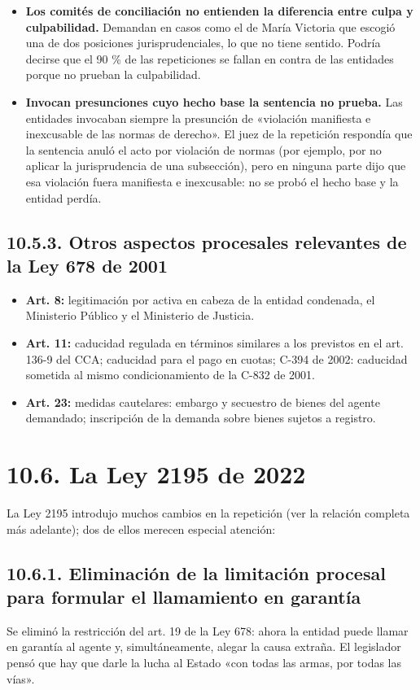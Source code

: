\begin{itemize}
\item \textbf{Los comités de conciliación no entienden la diferencia entre culpa y culpabilidad.} Demandan en casos como el de María Victoria que escogió una de dos posiciones jurisprudenciales, lo que no tiene sentido. Podría decirse que el 90 \% de las repeticiones se fallan en contra de las entidades porque no prueban la culpabilidad.
\item \textbf{Invocan presunciones cuyo hecho base la sentencia no prueba.} Las entidades invocaban siempre la presunción de «violación manifiesta e inexcusable de las normas de derecho». El juez de la repetición respondía que la sentencia anuló el acto por violación de normas (por ejemplo, por no aplicar la jurisprudencia de una subsección), pero en ninguna parte dijo que esa violación fuera manifiesta e inexcusable: no se probó el hecho base y la entidad perdía.
\end{itemize}
\subsection{10.5.3. Otros aspectos procesales relevantes de la Ley 678 de 2001}
\begin{itemize}
\item \textbf{Art. 8:} legitimación por activa en cabeza de la entidad condenada, el Ministerio Público y el Ministerio de Justicia.
\item \textbf{Art. 11:} caducidad regulada en términos similares a los previstos en el art. 136-9 del CCA; caducidad para el pago en cuotas; C-394 de 2002: caducidad sometida al mismo condicionamiento de la C-832 de 2001.
\item \textbf{Art. 23:} medidas cautelares: embargo y secuestro de bienes del agente demandado; inscripción de la demanda sobre bienes sujetos a registro.
\end{itemize}
\section{10.6. La Ley 2195 de 2022}
La Ley 2195 introdujo muchos cambios en la repetición (ver la relación completa más adelante); dos de ellos merecen especial atención:

\subsection{10.6.1. Eliminación de la limitación procesal para formular el llamamiento en garantía}
Se eliminó la restricción del art. 19 de la Ley 678: ahora la entidad puede llamar en garantía al agente y, simultáneamente, alegar la causa extraña. El legislador pensó que hay que darle la lucha al Estado «con todas las armas, por todas las vías».

